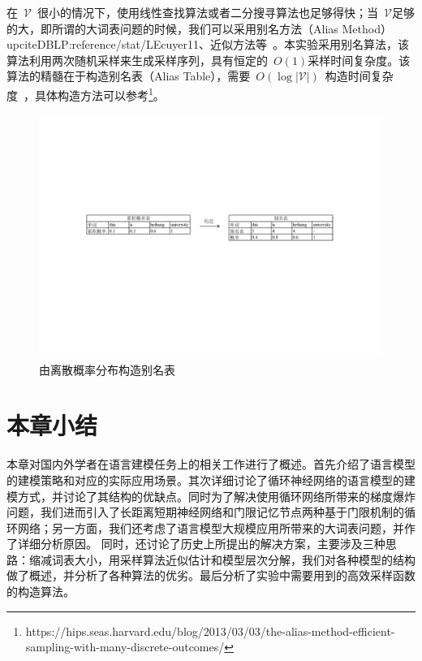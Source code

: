 在~$\mathcal{V}$~很小的情况下，使用线性查找算法或者二分搜寻算法也足够得快；当~$\mathcal{V}$足够的大，即所谓的大词表问题的时候，我们可以采用别名方法（Alias Method）upcite{DBLP:reference/stat/LEcuyer11}、近似方法等~。本实验采用别名算法，该算法利用两次随机采样来生成采样序列，具有恒定的~$O(1)$采样时间复杂度。该算法的精髓在于构造别名表（Alias Table），需要~$O(\log |\mathcal{V}|)$~构造时间复杂度~，具体构造方法可以参考\footnote{https://hips.seas.harvard.edu/blog/2013/03/03/the-alias-method-efficient-sampling-with-many-discrete-outcomes/}。

\begin{figure}[!t]
  \centering
\includegraphics[width=1\linewidth]{./figures/alias.pdf}
\caption{由离散概率分布构造别名表}\label{fig:alias}
\end{figure}

\section{本章小结}
本章对国内外学者在语言建模任务上的相关工作进行了概述。首先介绍了语言模型的建模策略和对应的实际应用场景。其次详细讨论了循环神经网络的语言模型的建模方式，并讨论了其结构的优缺点。同时为了解决使用循环网络所带来的梯度爆炸问题，我们进而引入了长距离短期神经网络和门限记忆节点两种基于门限机制的循环网络；另一方面，我们还考虑了语言模型大规模应用所带来的大词表问题，并作了详细分析原因。
同时，还讨论了历史上所提出的解决方案，主要涉及三种思路：缩减词表大小，用采样算法近似估计和模型层次分解，我们对各种模型的结构做了概述，并分析了各种算法的优劣。最后分析了实验中需要用到的高效采样函数的构造算法。